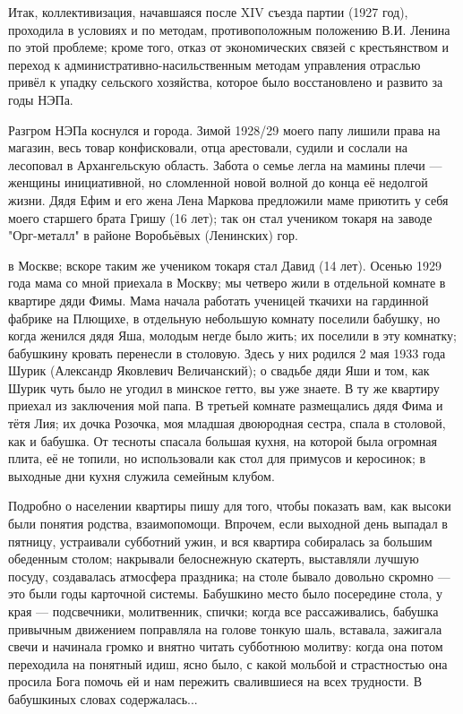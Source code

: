 \label{146-2}
Итак, коллективизация, начавшаяся после XIV съезда партии (1927 год), проходила в условиях и по методам, противоположным положению В.И. Ленина по этой проблеме; кроме того, отказ от экономических связей с крестьянством и переход к административно-насильственным методам управления отраслью привёл к упадку сельского хозяйства, которое было восстановлено и развито за годы НЭПа.

\label{147-1}
Разгром НЭПа коснулся и города. Зимой 1928/29 моего папу лишили права на магазин, весь товар конфисковали, отца арестовали, судили и сослали на лесоповал в Архангельскую область. Забота о семье легла на мамины плечи — женщины инициативной, но сломленной новой волной до конца её недолгой жизни. Дядя Ефим и его жена Лена Маркова предложили маме приютить у себя моего старшего брата Гришу (16 лет); так он стал учеником токаря на заводе "Орг-металл" в районе Воробьёвых (Ленинских) гор.

\label{148-1}
в Москве; вскоре таким же учеником токаря стал Давид (14 лет). Осенью 1929 года мама со мной приехала в Москву; мы четверо жили в отдельной комнате в квартире дяди Фимы. Мама начала работать ученицей ткачихи на гардинной фабрике на Плющихе, в отдельную небольшую комнату поселили бабушку, но когда женился дядя Яша, молодым негде было жить; их поселили в эту комнатку; бабушкину кровать перенесли в столовую. Здесь у них родился 2 мая 1933 года Шурик (Александр Яковлевич Величанский); о свадьбе дяди Яши и том, как Шурик чуть было не угодил в минское гетто, вы уже знаете. В ту же квартиру приехал из заключения мой папа. В третьей комнате размещались дядя Фима и тётя Лия; их дочка Розочка, моя младшая двоюродная сестра, спала в столовой, как и бабушка. От тесноты спасала большая кухня, на которой была огромная плита, её не топили, но использовали как стол для примусов и керосинок; в выходные дни кухня служила семейным клубом.

\label{149-1}
Подробно о населении квартиры пишу для того, чтобы показать вам, как высоки были понятия родства, взаимопомощи. Впрочем, если выходной день выпадал в пятницу, устраивали субботний ужин, и вся квартира собиралась за большим обеденным столом; накрывали белоснежную скатерть, выставляли лучшую посуду, создавалась атмосфера праздника; на столе бывало довольно скромно — это были годы карточной системы. Бабушкино место было посередине стола, у края — подсвечники, молитвенник, спички; когда все рассаживались, бабушка привычным движением поправляла на голове тонкую шаль, вставала, зажигала свечи и начинала громко и внятно читать субботнюю молитву: когда она потом переходила на понятный идиш, ясно было, с какой мольбой и страстностью она просила Бога помочь ей и нам пережить свалившиеся на всех трудности. В бабушкиных словах содержалась...

